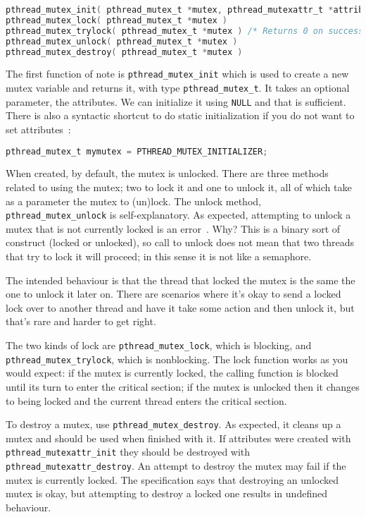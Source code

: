 \begin{lstlisting}[language=C]
pthread_mutex_init( pthread_mutex_t *mutex, pthread_mutexattr_t *attributes )
pthread_mutex_lock( pthread_mutex_t *mutex )
pthread_mutex_trylock( pthread_mutex_t *mutex ) /* Returns 0 on success */
pthread_mutex_unlock( pthread_mutex_t *mutex )
pthread_mutex_destroy( pthread_mutex_t *mutex )
\end{lstlisting}

The first function of note is \texttt{pthread\_mutex\_init} which is used to create a new mutex variable and returns it, with type \texttt{pthread\_mutex\_t}. It takes an optional parameter, the attributes. We can initialize it using \texttt{NULL} and that is sufficient. There is also a syntactic shortcut to do static initialization if you do not want to set attributes~\cite{pthreads}:

\begin{lstlisting}[language=C]
pthread_mutex_t mymutex = PTHREAD_MUTEX_INITIALIZER;
\end{lstlisting}

When created, by default, the mutex is unlocked. There are three methods related to using the mutex; two to lock it and one to unlock it, all of which take as a parameter the mutex to (un)lock. The unlock method, \texttt{pthread\_mutex\_unlock} is self-explanatory. As expected, attempting to unlock a mutex that is not currently locked is an error~\cite{pthreads}. Why? This is a binary sort of construct (locked or unlocked), so call to unlock does not mean that two threads that try to lock it will proceed; in this sense it is not like a semaphore.

The intended behaviour is that the thread that locked the mutex is the same the one to unlock it later on. There are scenarios where it's okay to send a locked lock over to another thread and have it take some action and then unlock it, but that's rare and harder to get right. 

The two kinds of lock are \texttt{pthread\_mutex\_lock}, which is blocking, and \texttt{pthread\_mutex\_trylock}, which is nonblocking. The lock function works as you would expect: if the mutex is currently locked, the calling function is blocked until its turn to enter the critical section; if the mutex is unlocked then it changes to being locked and the current thread enters the critical section.

To destroy a mutex, use \texttt{pthread\_mutex\_destroy}. As expected, it cleans up a mutex and should be used when finished with it. If attributes were created with \texttt{pthread\_mutexattr\_init} they should be destroyed with \texttt{pthread\_mutexattr\_destroy}. An attempt to destroy the mutex may fail if the mutex is currently locked. The specification says that destroying an unlocked mutex is okay, but attempting to destroy a locked one results in undefined behaviour.



